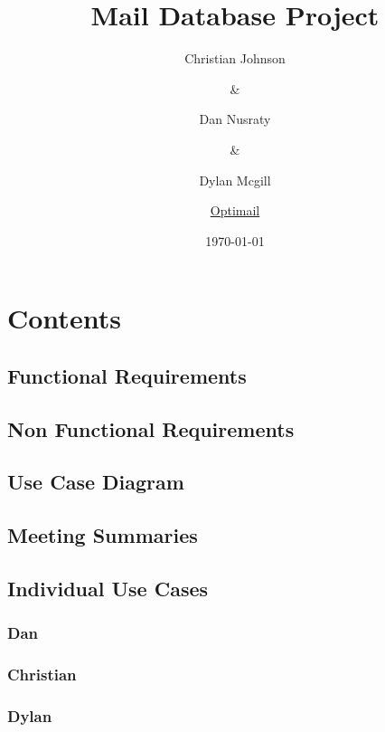 \documentclass[11pt]{article}
\author{Christian Johnson\and\&\and Dan Nusraty\and\&\and Dylan Mcgill\and \newline \uline{Optimail}}
\date{\today}
\title{Mail Database Project}
\begin{document}
\maketitle

\section{Contents}
\label{sec:org5b9eeda}
\subsection{Functional Requirements}
\label{sec:org4d06cec}
\subsection{Non Functional Requirements}
\label{sec:orgefc45a3}
\subsection{Use Case Diagram}
\label{sec:orgc6c622c}
\subsection{Meeting Summaries}
\label{sec:org0018a43}
\subsection{Individual Use Cases}
\label{sec:org27816d4}
\subsubsection{Dan}
\label{sec:org87cd082}
\subsubsection{Christian}
\label{sec:org8380ec5}
\subsubsection{Dylan}
\label{sec:orgb3cce39}
\clearpage
\end{document}
